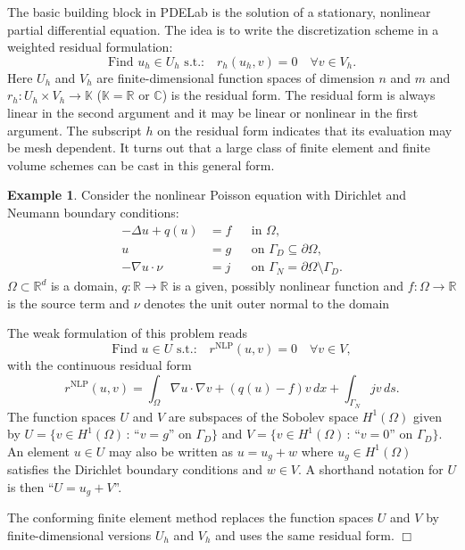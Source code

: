 \documentclass[a4paper,12pt]{article}
\theoremstyle{definition}
\newtheorem{exm}{Example}
\begin{document}
The basic building block in PDELab is the solution of 
a stationary, nonlinear partial differential equation.
The idea is to write the discretization scheme in a weighted residual formulation:
\begin{equation}
\text{Find $u_h\in U_h$ s.t.:} \quad r_h(u_h,v)=0 \quad \forall v\in V_h.
\label{Eq:BasicBuildingBlock}
\end{equation}
Here $U_h$ and $V_h$ are finite-dimensional function spaces of dimension $n$ and $m$
and $r_h: U_h\times V_h\to\mathbb{K}$ ($\mathbb{K}=\mathbb{R}$ or 
$\mathbb{C}$) is the residual form. The residual 
form is always linear in the second argument and it may be linear or nonlinear in the first
argument. The subscript $h$ on the residual form indicates that its evaluation may be mesh dependent.
It turns out that a large class of finite element and finite volume schemes
can be cast in this general form.

\begin{exm} \label{Exm:NonlinearPoisson}
Consider the nonlinear Poisson equation with
Dirichlet and Neumann boundary conditions:
\begin{align*}
-\Delta u + q(u) &= f &&\text{in $\Omega$},\\
u &= g &&\text{on $\Gamma_D\subseteq\partial\Omega$},\\
-\nabla u\cdot \nu &= j &&\text{on $\Gamma_N=\partial\Omega\setminus\Gamma_D$}.
\end{align*}
$\Omega\subset\mathbb{R}^d$ is a domain, $q:\mathbb{R}\to\mathbb{R}$ is a given, possibly
nonlinear function and $f: \Omega\to\mathbb{R}$ is the source term and
$\nu$ denotes the unit outer normal to the domain

The weak formulation of this problem reads
\begin{equation*}
\text{Find $u\in U$ s.t.:} \quad r^{\text{NLP}}(u,v)=0 \quad \forall v\in V,
\end{equation*}
with the continuous residual form
\begin{equation*}
r^{\text{NLP}}(u,v) = \int_\Omega \nabla u \cdot \nabla v + (q(u)-f)v\,dx + \int_{\Gamma_N} jv\,ds .
\end{equation*}
The function spaces $U$ and $V$ are subspaces of the Sobolev space $H^1(\Omega)$ given by
$U= \{v\in H^1(\Omega) \,:\, \text{``$v=g$'' on $\Gamma_D$}\}$
and $V= \{v\in H^1(\Omega) \,:\, \text{``$v=0$'' on $\Gamma_D$}\}$. An element $u\in U$ may
also be written as $u=u_g + w$ where $u_g\in H^1(\Omega)$ satisfies the Dirichlet boundary
conditions and $w\in V$. A shorthand notation for $U$ is then ``$U=u_g+V$''.

The conforming finite element method \cite{BrennerScott,Elman2005,Ern}
replaces the function spaces
$U$ and $V$ by finite-dimensional versions $U_h$ and $V_h$ and uses the same residual form.
\hfill$\Box$
\end{exm}
\end{document}
